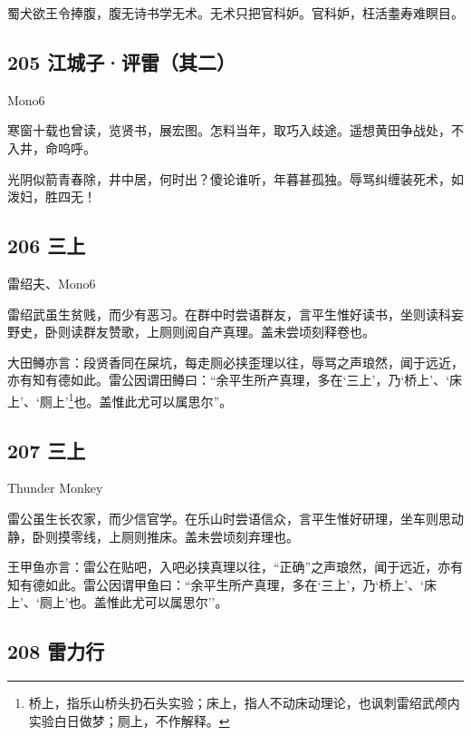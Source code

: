 蜀犬欲王令捧腹，腹无诗书学无术。无术只把官科妒。官科妒，枉活耋寿难瞑目。

\hypertarget{ux6c5fux57ceux5b50ux8bc4ux96f7ux5176ux4e8c}{%
\subsection{205
江城子·评雷（其二）}\label{ux6c5fux57ceux5b50ux8bc4ux96f7ux5176ux4e8c}}

Mono6

寒窗十载也曾读，览贤书，展宏图。怎料当年，取巧入歧途。遥想黄田争战处，不入井，命呜呼。

光阴似箭青春除，井中居，何时出？傻论谁听，年暮甚孤独。辱骂纠缠装死术，如泼妇，胜四无！
~\\

\hypertarget{ux4e09ux4e0a}{%
\subsection{206 三上}\label{ux4e09ux4e0a}}

雷绍夫、Mono6

雷绍武虽生贫贱，而少有恶习。在群中时尝语群友，言平生惟好读书，坐则读科妄野史，卧则读群友赞歌，上厕则阅自产真理。盖未尝顷刻释卷也。

大田鳟亦言：段贤香同在屎坑，每走厕必挟歪理以往，辱骂之声琅然，闻于远近，亦有知有德如此。雷公因谓田鳟曰：``余平生所产真理，多在`三上'，乃`桥上'、`床上'、`厕上'\footnote{桥上，指乐山桥头扔石头实验；床上，指人不动床动理论，也讽刺雷绍武颅内实验白日做梦；厕上，不作解释。}也。盖惟此尤可以属思尔''。

\hypertarget{ux4e09ux4e0a-1}{%
\subsection{207 三上}\label{ux4e09ux4e0a-1}}

Thunder Monkey

雷公虽生长农家，而少信官学。在乐山时尝语信众，言平生惟好研理，坐车则思动静，卧则摸零线，上厕则推床。盖未尝顷刻弃理也。

王甲鱼亦言：雷公在贴吧，入吧必挟真理以往，``正确''之声琅然，闻于远近，亦有知有德如此。雷公因谓甲鱼曰：``余平生所产真理，多在`三上'，乃`桥上'、`床上'、`厕上'也。盖惟此尤可以属思尔''。

\hypertarget{ux96f7ux529bux884c}{%
\subsection{208 雷力行}\label{ux96f7ux529bux884c}}

